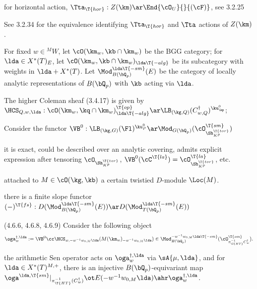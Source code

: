 \documentclass[article, a4paper, twoside]{universal}
\begin{document}
\begin{cmt}

    for horizontal action, $\Tta_{\T{hor}}:Z(\km)\ar\End{\cO_{U}}{}{(\cF)}$, see 3.2.25

    See 3.2.34 for the equivalence identifying $\Tta_{\T{hor}}$ and $\Tta$ actions of $Z(\km)$.


    For fixed $w\in{}^{M}W$, let $\cO(\km_{w},\kb\cap\km_{w})$ be the BGG category; for $\lda\in X^{*}(T)_{E}$, let $\cO(\km_{w},\kb\cap\km_{w})_{\lda\T{-alg}}$ be its subcategory with weights in $\lda+X^{*}(T)$. Let $\Mod_{B(\bQ_p)}^{\lda\T{-sm}}(E)$ be the category of locally analytic representations of $B(\bQ_{p})$ with $\kb$ acting via $\lda$.


    The higher Coleman sheaf (3.4.17) is given by $\HCS_{Q,w,\lda}:\cO(\km_{w},\kq\cap\km_{w})_{\lda\T{-alg}}^{\T{op}}\ar\LB_{(\kg,Q)}(C_{w,Q}^{\dag})^{\ku_{\kp}^{0}}$;



        Consider the functor $\VB^{0}:\LB_{(\kg,G)}(\Fl)^{\ku_{P}^{0}}\ar\Mod_{G(\bQ_{p})}(\cO_{\Sh_{K^{p}}^{\T{tor}}}^{\T{sm}})$

    it is exact, could be described over an analytic covering, admits explicit expression after tensoring $\cO_{\Sh_{K^{p}}^{\T{tor}}}$, $\VB^{0}(\cC^{\T{la}})=\cO_{\Sh_{K^{p}}^{\T{tor}}}^{\T{la}}$, etc.




        attached to $M\in\cO(\kg,\kb)$ a certain twistied $D$-module $\Loc(M)$.


        there is a finite slope functor $(-)^{\T{fs}}:D(\Mod_{B(\bQ_{p})}^{\lda\T{-sm}}(E))\ar D(\Mod_{T(\bQ_{p})}^{\lda\T{-sm}}(E))$


    (4.6.6, 4.6.8, 4.6.9) Consider the following object
    \[
        \oga_{w}^{\dag,\lda}:=\VB^{0}\cc\HCS_{w,-w^{-1}w_{0,M}\lda}(M(\km_{w})_{-w^{-1}w_{0,M}\lda})\in\Mod_{B(\bQ_{p})}^{-w^{-1}w_{0,M}\lda\T{-sm}}(\cO_{\pi_{\T{HT}}^{-1}C_{w}^{\dag}}^{\T{sm}}).
    \]

     the arithmetic Sen operator acts on $\oga_{w}^{\dag,\lda}$ via $\sA{\mu,\lda}$, and for $\lda\in X^{*}(T)^{M,+}$, there is an injective $B(\bQ_{p})$-equivariant map $\oga^{\lda,\T{sm}}|_{\pi_{\T{HT}}^{-1}(C_{w}^{\dag})}\ot E(-w^{-1}w_{0,M}\lda)\ahr\oga_{w}^{\dag,\lda}$.



\end{cmt}
\end{document}
